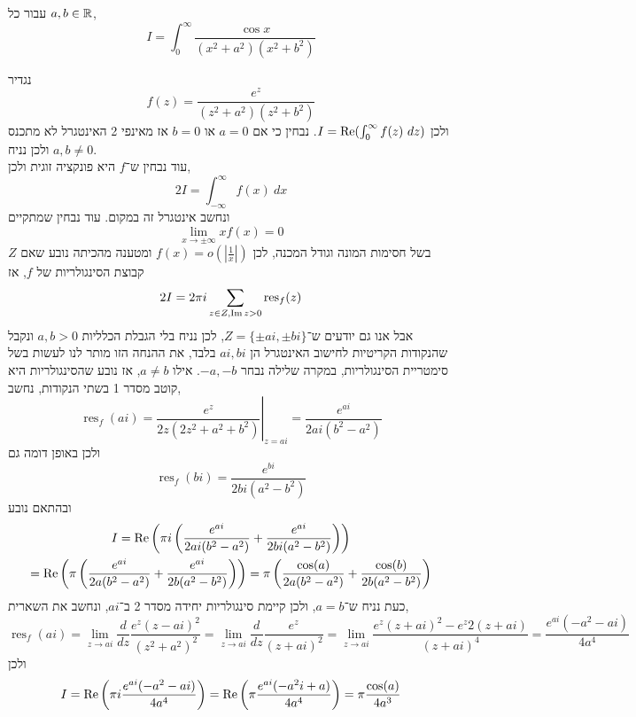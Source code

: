 \subquestion{}
עבור כל $a, b \in \mathbb{R}$,
\[
	I = \int_{0}^{\infty} \frac{\cos x}{(x^2 + a^2)(x^2 + b^2)}
\]
\begin{solution}
	נגדיר
	\[
		f(z)
		= \frac{e^z}{(z^2 + a^2)(z^2 + b^2)}
	\]
	ולכן $I = \re(\int_{0}^{\infty} f(z)\ dz)$.
	נבחין כי אם $a = 0$ או $b = 0$ אז מאינפי 2 האינטגרל לא מתכנס ולכן נניח $a, b \ne 0$. \\
	עוד נבחין ש־$f$ היא פונקציה זוגית ולכן,
	\[
		2I
		= \int_{-\infty}^{\infty} f(x)\ dx
	\]
	ונחשב אינטגרל זה במקום. 
	עוד נבחין שמתקיים
	\[
		\lim_{x \to \pm\infty} x f(x)
		= 0
	\]
	בשל חסימות המונה וגודל המכנה, לכן $f(x) = o(|\frac{1}{x}|)$ ומטענה מהכיתה נובע שאם $Z$ קבוצת הסינגולריות של $f$, אז
	\[
		2I
		= 2\pi i \sum_{z \in Z, \operatorname{Im} z > 0} \operatorname{res}_f(z)
	\]
	אבל אנו גם יודעים ש־$Z = \{\pm ai, \pm bi \}$, לכן נניח בלי הגבלת הכלליות $a, b > 0$ ונקבל שהנקודות הקריטיות לחישוב האינטגרל הן $ai, bi$ בלבד, את ההנחה הזו מותר לנו לעשות בשל סימטריית הסינגולריות, במקרה שלילה נבחר $-a, -b$.
	אילו $a \ne b$, אז נובע שהסינגולריות היא קוטב מסדר 1 בשתי הנקודות, נחשב,
	\[
		\operatorname{res}_f(ai)
		= \left. \frac{e^z}{2z (2z^2 + a^2 + b^2)} \right\rvert_{z = ai}
		= \frac{e^{ai}}{2ai (b^2 - a^2)}
	\]
	ולכן באופן דומה גם
	\[
		\operatorname{res}_f(bi)
		= \frac{e^{bi}}{2bi (a^2 - b^2)}
	\]
	ובהתאם נובע
	\begin{multline*}
		I
		= \operatorname{Re}\left(\pi i \left(\frac{e^{ai}}{2ai (b^2 - a^2)} + \frac{e^{ai}}{2bi (a^2 - b^2)}\right)\right) \\
		= \operatorname{Re}\left(\pi \left(\frac{e^{ai}}{2a (b^2 - a^2)} + \frac{e^{ai}}{2b (a^2 - b^2)}\right)\right)
		= \pi \left(\frac{\cos(a)}{2a (b^2 - a^2)} + \frac{\cos(b)}{2b (a^2 - b^2)}\right)
	\end{multline*}
	כעת נניח ש־$a = b$, ולכן קיימת סינגולריות יחידה מסדר 2 ב־$ai$, ונחשב את השארית,
	\[
		\operatorname{res}_f(ai)
		= \lim_{z \to ai} \frac{d}{dz} \frac{e^z {(z - ai)}^2}{{(z^2 + a^2)}^2}
		= \lim_{z \to ai} \frac{d}{dz} \frac{e^z}{{(z + ai)}^2}
		= \lim_{z \to ai} \frac{e^z {(z + ai)}^2 - e^z 2 (z + ai)}{{(z + ai)}^4}
		= \frac{e^{ai} (-a^2 - ai)}{4 a^4}
	\]
	ולכן
	\[
		I
		= \operatorname{Re}\left( \pi i \frac{e^{ai} (-a^2 - ai)}{4 a^4} \right)
		= \operatorname{Re}\left( \pi \frac{e^{ai} (-a^2i + a)}{4 a^4} \right)
		= \pi \frac{\cos(a)}{4 a^3} 
	\]
\end{solution}

